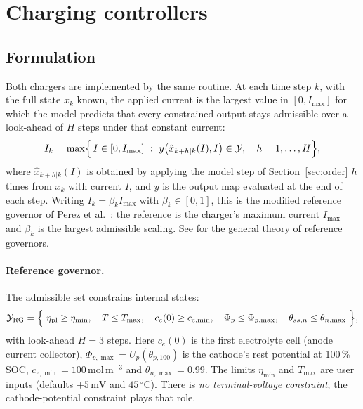 \documentclass[11pt]{article}
\newcommand{\ce}{c_{e}}
\newcommand{\etapl}{\eta_{\mathrm{pl}}}
\newcommand{\unit}[1]{\,\mathrm{#1}}
\begin{document}
\section{Charging controllers}\label{sec:rg}

\subsection{Formulation}
Both chargers are implemented by the same routine. At each time step $k$, with the full state $x_k$ known, the applied current is the largest value in $[0,I_{\max}]$ for which the model predicts that every constrained output stays admissible over a look-ahead of $H$ steps under that constant current:
\begin{equation}
I_k=\max\Bigl\{\,I\in[0,I_{\max}]\ :\ y\bigl(\hat x_{k+h|k}(I),I\bigr)\in\mathcal Y,\quad h=1,\dots,H\Bigr\}, \label{eq:rg}
\end{equation}
where $\hat x_{k+h|k}(I)$ is obtained by applying the model step of Section~\ref{sec:order} $h$ times from $x_k$ with current $I$, and $y$ is the output map evaluated at the end of each step. Writing $I_k=\beta_kI_{\max}$ with $\beta_k\in[0,1]$, this is the modified reference governor of Perez et al.~\cite{perez2015}: the reference is the charger's maximum current $I_{\max}$ and $\beta_k$ is the largest admissible scaling. See \cite{garone2017} for the general theory of reference governors.

\paragraph{Reference governor.} The admissible set constrains internal states:
\begin{equation}
\mathcal Y_{\mathrm{RG}}=\Bigl\{\ \etapl\ge\eta_{\min},\quad T\le T_{\max},\quad \ce(0)\ge c_{e,\min},\quad \Phi_p\le\Phi_{p,\max},\quad \theta_{ss,n}\le\theta_{n,\max}\ \Bigr\},\label{eq:Yrg}
\end{equation}
with look-ahead $H=3$ steps. Here $\ce(0)$ is the first electrolyte cell (anode current collector), $\Phi_{p,\max}=U_p(\theta_{p,100})$ is the cathode's rest potential at 100\,\% SOC, $c_{e,\min}=100\unit{mol\,m^{-3}}$ and $\theta_{n,\max}=0.99$. The limits $\eta_{\min}$ and $T_{\max}$ are user inputs (defaults $+5\unit{mV}$ and $45\,^{\circ}\mathrm{C}$). There is \emph{no terminal-voltage constraint}; the cathode-potential constraint plays that role.
\end{document}
